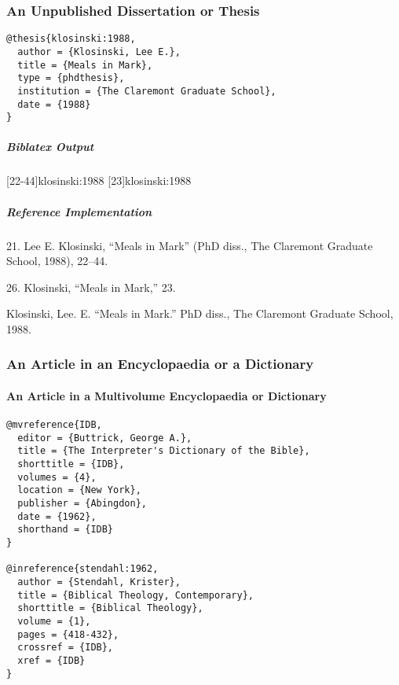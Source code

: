 \documentclass[a4paper]{article}
\newenvironment{biboutput}{%
  \subparagraph{Biblatex Output}
}{\color{black}}
\newenvironment{refimp}{%
  \subparagraph{Reference Implementation}
  \color{reference-colour}
  \rm
}{\par\color{black}}
\begin{document}
\subsubsection{An Unpublished Dissertation or Thesis}

\begin{lstlisting}
@thesis{klosinski:1988,
  author = {Klosinski, Lee E.},
  title = {Meals in Mark},
  type = {phdthesis},
  institution = {The Claremont Graduate School},
  date = {1988}
}
\end{lstlisting}  

\begin{biboutput}
  [22-44]{klosinski:1988}
  [23]{klosinski:1988}
\end{biboutput}

\begin{refimp}
  \hspace*{\bibindent}21. Lee E. Klosinski, “Meals in Mark” (PhD diss., The
  Claremont Graduate School, 1988), 22–44.

  \hspace*{\bibindent}26. Klosinski, “Meals in Mark,” 23.

  \hangindent\bibindent Klosinski, Lee. E. “Meals in Mark.” PhD diss., The
  Claremont Graduate School, 1988.
\end{refimp}

\subsubsection{An Article in an Encyclopaedia or a Dictionary}

\paragraph{An Article in a Multivolume Encyclopaedia or Dictionary}

\begin{lstlisting}
@mvreference{IDB,
  editor = {Buttrick, George A.},
  title = {The Interpreter's Dictionary of the Bible},
  shorttitle = {IDB},
  volumes = {4},
  location = {New York},
  publisher = {Abingdon},
  date = {1962},
  shorthand = {IDB}
}

@inreference{stendahl:1962,
  author = {Stendahl, Krister},
  title = {Biblical Theology, Contemporary},
  shorttitle = {Biblical Theology},
  volume = {1},
  pages = {418-432},
  crossref = {IDB},
  xref = {IDB}
}
\end{lstlisting}  
\end{document}
